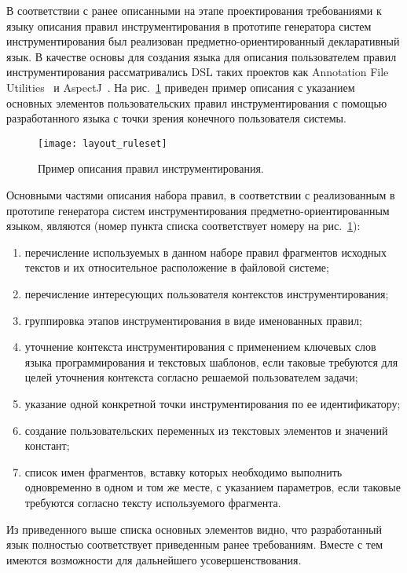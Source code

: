 В соответствии с ранее описанными на этапе проектирования требованиями к языку описания правил инструментирования в прототипе генератора систем инструментирования был реализован предметно-ориентированный декларативный язык.
В качестве основы для создания языка для описания пользователем правил инструментирования рассматривались DSL таких проектов как Annotation File Utilities~\cite{jaif} и AspectJ~\cite{aspectj}.
На рис.~\ref{fig:layout-ruleset} приведен пример описания с указанием основных элементов пользовательских правил инструментирования с помощью разработанного языка с точки зрения конечного пользователя системы.

\begin{figure}[!h]
  \centering
  \texttt{[image: layout\_ruleset]}
  \caption{Пример описания правил инструментирования.}
  \label{fig:layout-ruleset}
\end{figure}

Основными частями описания набора правил, в соответствии с реализованным в прототипе генератора систем инструментирования предметно-ориентированным языком, являются (номер пункта списка соответствует номеру на рис.~\ref{fig:layout-ruleset}):
\begin{enumerate}[noitemsep]
  \item перечисление используемых в данном наборе правил фрагментов исходных текстов и их относительное расположение в файловой системе;
  \item перечисление интересующих пользователя контекстов инструментирования;
  \item группировка этапов инструментирования в виде именованных правил;
  \item уточнение контекста инструментирования с применением ключевых слов языка программирования и текстовых шаблонов, если таковые требуются для целей уточнения контекста согласно решаемой пользователем задачи;
  \item указание одной конкретной точки инструментирования по ее идентификатору;
  \item создание пользовательских переменных из текстовых элементов и значений констант;
  \item список имен фрагментов, вставку которых необходимо выполнить одновременно в одном и том же месте, с указанием параметров, если таковые требуются согласно тексту используемого фрагмента.
\end{enumerate}

Из приведенного выше списка основных элементов видно, что разработанный язык полностью соответствует приведенным ранее требованиям.
Вместе с тем имеются возможности для дальнейшего усовершенствования.

